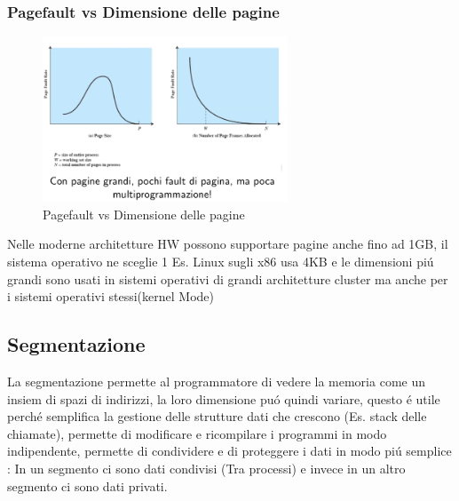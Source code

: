     \subsubsection*{Pagefault vs Dimensione delle pagine}
    \begin{figure}[H]
        \centering
        \includegraphics[width=0.65\textwidth]{immagini/Grafico1}
        \caption{Pagefault vs Dimensione delle pagine}
    \end{figure}
    Nelle moderne architetture HW possono supportare pagine anche fino ad 1GB, il sistema operativo
    ne sceglie 1 Es. Linux sugli x86 usa 4KB e le dimensioni piú grandi sono usati in sistemi operativi di grandi architetture
    cluster \ldotsecc ma anche per i sistemi operativi stessi(kernel Mode)

    \subsection{Segmentazione}
    La segmentazione permette al programmatore di vedere la memoria come un insiem di spazi di indirizzi, la loro dimensione puó
    quindi variare, questo é utile perché semplifica la gestione delle strutture dati che crescono (Es. stack delle chiamate),
    permette di modificare e ricompilare i programmi in modo indipendente, permette di condividere e di proteggere i dati
    in modo piú semplice : In un segmento ci sono dati condivisi (Tra processi) e invece in un altro segmento ci sono dati
    privati.
